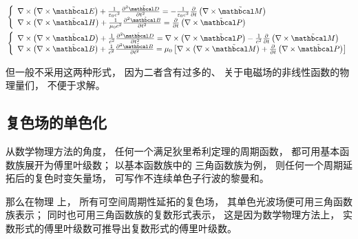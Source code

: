 {\setlength\abovedisplayskip{0pt} %
	\setlength\belowdisplayskip{0pt}
	\begin{align}
		&\left\{ \begin{array}{l}
			\nabla  \times \left( {\nabla  \times \tilde {\mathbcal E}} \right) + \frac{1}{{{\varepsilon _0}{c^2}}}\frac{{{\partial ^2}\tilde {\mathbcal D}}}{{\partial {t^2}}} =  - \frac{1}{{{\varepsilon _0}{c^2}}}\frac{\partial }{{\partial t}}\left( {\nabla  \times \tilde {\mathbcal M}} \right)\\
			\nabla  \times \left( {\nabla  \times \tilde {\mathbcal H}} \right) + \frac{1}{{{\mu _0}{c^2}}}\frac{{{\partial ^2}\tilde {\mathbcal B}}}{{\partial {t^2}}} = \frac{\partial }{{\partial t}}\left( {\nabla  \times \tilde {\mathbcal P}} \right)
			\end{array} \right.\\
		&\left\{ \begin{array}{l}
			\nabla  \times \left( {\nabla  \times \tilde {\mathbcal D}} \right) + \frac{1}{{{c^2}}}\frac{{{\partial ^2}\tilde {\mathbcal D}}}{{\partial {t^2}}} = \nabla  \times \left( {\nabla  \times \tilde {\mathbcal P}} \right) - \frac{1}{{{c^2}}}\frac{\partial }{{\partial t}}\left( {\nabla  \times \tilde {\mathbcal M}} \right)\\
			\nabla  \times \left( {\nabla  \times \tilde {\mathbcal B}} \right) + \frac{1}{{{c^2}}}\frac{{{\partial ^2}\tilde {\mathbcal B}}}{{\partial {t^2}}} = {\mu _0}\left[ {\nabla  \times \left( {\nabla  \times \tilde {\mathbcal M}} \right) + \frac{\partial }{{\partial t}}\left( {\nabla  \times \tilde {\mathbcal P}} \right)} \right]
			\end{array} \right.
	\end{align}
}

但一般不采用这两种形式， 因为二者含有过多的、 关于电磁场的非线性函数的物理量们， 不便于求解。

\subsection{复色场的单色化}

从数学物理方法的角度， 任何一个满足狄里希利定理的周期函数， 都可用基本函数族展开为傅里叶级数； 以基本函数族中的
三角函数族为例， 则任何一个周期延拓后的复色时变矢量场， 可写作不连续单色子行波的黎曼和。 

那么在物理
上， 所有可空间周期性延拓的复色场， 其单色光波场便可用三角函数族表示； 同时也可用三角函数族的复数形式表示， 
这是因为数学物理方法上， 实数形式的傅里叶级数可推导出复数形式的傅里叶级数。 

